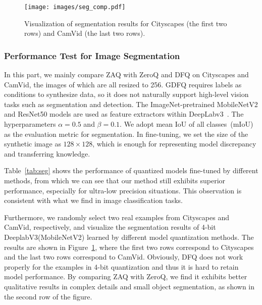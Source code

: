 \documentclass[final]{cvpr}
\begin{document}
\begin{figure}[!t]
  \centering
  \texttt{[image: images/seg\_comp.pdf]}
  \caption{Visualization of segmentation results for Cityscapes (the first two rows) and CamVid (the last two rows).}
  \label{fig:visual_real_seg}
\end{figure}

\subsubsection{Performance Test for Image Segmentation}

In this part, we mainly compare ZAQ with ZeroQ and DFQ on Cityscapes and CamVid, the images of which are all resized to 256.
GDFQ requires labels as conditions to synthesize data, so it does not naturally support high-level vision tasks such as segmentation and detection.
The ImageNet-pretrained MobileNetV2 and ResNet50 models are used as feature extractors within DeepLabv3~\cite{chen2017rethinking}. The hyperparameters $\alpha=0.5$ and $\beta=0.1$. 
We adopt mean IoU of all classes~(mIoU) as the evaluation metric for segmentation. 
In fine-tuning, we set the size of the synthetic image as $128\times128$, which is enough for representing model discrepancy and transferring knowledge.

Table~\ref{tab:seg} shows the performance of quantized models fine-tuned by different methods, from which we can see that our method still exhibits superior performance, especially for ultra-low precision situations.
This observation is consistent with what we find in image classification tasks.

Furthermore, we randomly select two real examples from Cityscapes and CamVid, respectively, and visualize the segmentation results of 4-bit DeeplabV3(MobileNetV2) learned by different model quantization methods.
The results are shown in Figure~\ref{fig:visual_real_seg}, where the first two rows correspond to Cityscapes and the last two rows correspond to CamVid.
Obviously, DFQ does not work properly for the examples in 4-bit quantization and thus it is hard to retain model performance. 
By comparing ZAQ with ZeroQ, we find it exhibits better qualitative results in complex details and small object segmentation, as shown in the second row of the figure.
\end{document}
